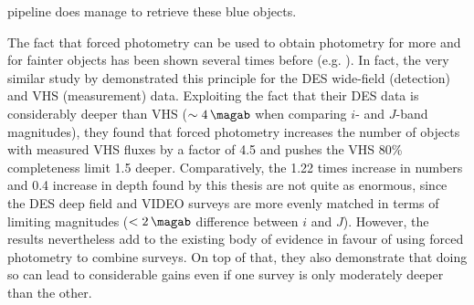 pipeline does manage to retrieve these blue objects. \par 

The fact that forced photometry can be used to obtain photometry for more and for fainter objects has been shown several times before (e.g. \citealt{2015MNRAS.446.2523B,2016AJ....151...36L,2017ApJS..230....9N}). In fact, the very similar study by \cite{2015MNRAS.446.2523B} demonstrated this principle for the DES wide-field (detection) and VHS (measurement) data. Exploiting the fact that their DES data is considerably deeper than VHS ($\sim\SI{4}{\magab}$ when comparing $i$- and $J$-band magnitudes), they found that forced photometry increases the number of objects with measured VHS fluxes by a factor of 4.5 and pushes the VHS 80\% completeness limit \SI{1.5}{\mag} deeper. Comparatively, the 1.22 times increase in numbers and  \SI{0.4}{\mag} increase in depth found by this thesis are not quite as enormous, since the DES deep field and VIDEO surveys are more evenly matched in terms of limiting magnitudes ($<\SI{2}{\magab}$ difference between $i$ and $J$). However, the \DESVIDEO results nevertheless add to the existing body of evidence in favour of using forced photometry to combine surveys. On top of that, they also demonstrate that doing so can lead to considerable gains even if one survey is only moderately deeper than the other. \par


